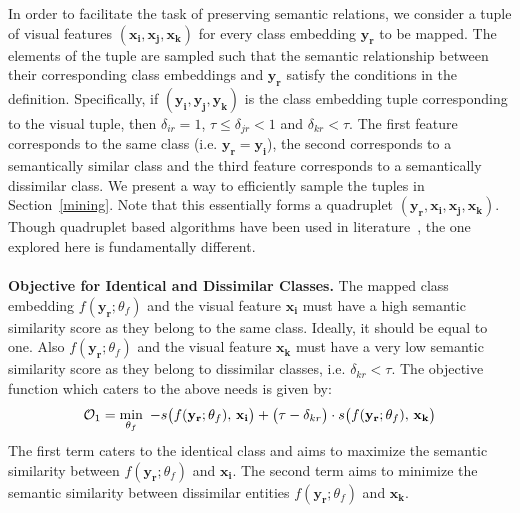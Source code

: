 \documentclass[10pt,twocolumn,letterpaper]{article}
\begin{document}
In order to facilitate the task of preserving semantic relations, we consider a tuple of visual features $(\mathbf{x_i},\mathbf{x_j},\mathbf{x_k})$ for every %
class embedding $\mathbf{y_r}$ to be mapped. 
The elements of the tuple are sampled such that the semantic relationship between their corresponding class embeddings and  $\mathbf{y_r}$ satisfy the conditions in the definition. 
Specifically, if $(\mathbf{y_i},\mathbf{y_j}, \mathbf{y_k})$ is the class embedding tuple corresponding to the visual tuple, then $\delta_{ir} = 1$, $\tau \leq \delta_{jr} < 1$ and $\delta_{kr} < \tau$. 
The first feature corresponds to the same class (i.e. $\mathbf{y_r}=\mathbf{y_i}$), the second corresponds to  a semantically similar class and the third feature corresponds to a semantically dissimilar class.
We present a way to efficiently sample the tuples in Section~\ref{mining}. 
Note that this essentially forms a quadruplet $(\mathbf{y_r},\mathbf{x_i},\mathbf{x_j}, \mathbf{x_k})$. 
Though quadruplet based algorithms have been used in literature~\cite{chen2017beyond}, the one explored here is fundamentally different. %
\\\\
\textbf{Objective for Identical and Dissimilar Classes.} The mapped class embedding $f(\mathbf{y_r};\theta_f)$ and the visual feature $\mathbf{x_i}$ must have a high semantic similarity score as they belong to the same class. Ideally, it should be equal to one. 
Also $f(\mathbf{y_r};\theta_f)$ and the visual feature $\mathbf{x_k}$ must have a very low semantic similarity score as they belong to dissimilar classes, i.e. $\delta_{kr} < \tau$. The objective function which caters to the above needs is given by:
\begin{equation}
\label{normal_loss}
\mathcal{O}_1 = \min_{\theta_f}\ \small{ -s\big(f(\mathbf{y_r};\theta_f),\,\mathbf{x_i}\big) + \big(\tau-\delta_{kr} \big)\cdot  s\big(f(\mathbf{y_r};\theta_f),\,\mathbf{x_k}\big)}
\end{equation}   
The first term caters to the identical class and aims to maximize the semantic similarity between $f(\mathbf{y_r}; \theta_f)$ and $\mathbf{x_i}$. %
The second term aims to minimize the semantic similarity between dissimilar entities $f(\mathbf{y_r};\theta_f)$ and $\mathbf{x_k}$. %
\end{document}
